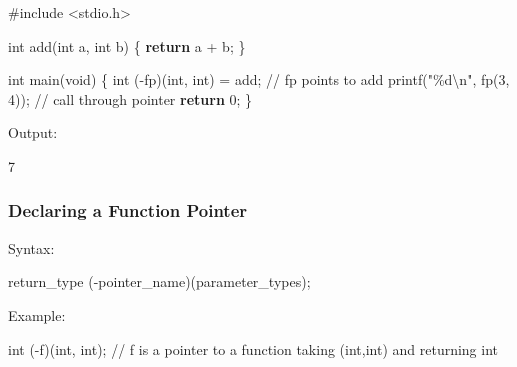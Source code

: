 \documentclass[
  letterpaper,
  DIV=11,
  numbers=noendperiod]{scrreprt}
\newenvironment{Shaded}{\begin{snugshade}}{\end{snugshade}}
\newcommand{\CommentTok}[1]{\textcolor[rgb]{0.37,0.37,0.37}{#1}}
\newcommand{\ControlFlowTok}[1]{\textcolor[rgb]{0.00,0.23,0.31}{\textbf{#1}}}
\newcommand{\DataTypeTok}[1]{\textcolor[rgb]{0.68,0.00,0.00}{#1}}
\newcommand{\DecValTok}[1]{\textcolor[rgb]{0.68,0.00,0.00}{#1}}
\newcommand{\ExtensionTok}[1]{\textcolor[rgb]{0.00,0.23,0.31}{#1}}
\newcommand{\ImportTok}[1]{\textcolor[rgb]{0.00,0.46,0.62}{#1}}
\newcommand{\NormalTok}[1]{\textcolor[rgb]{0.00,0.23,0.31}{#1}}
\newcommand{\OperatorTok}[1]{\textcolor[rgb]{0.37,0.37,0.37}{#1}}
\newcommand{\PreprocessorTok}[1]{\textcolor[rgb]{0.68,0.00,0.00}{#1}}
\newcommand{\SpecialCharTok}[1]{\textcolor[rgb]{0.37,0.37,0.37}{#1}}
\newcommand{\StringTok}[1]{\textcolor[rgb]{0.13,0.47,0.30}{#1}}
\begin{document}
\begin{Shaded}
\begin{Highlighting}[]
\PreprocessorTok{\#include }\ImportTok{\textless{}stdio.h\textgreater{}}

\DataTypeTok{int}\NormalTok{ add}\OperatorTok{(}\DataTypeTok{int}\NormalTok{ a}\OperatorTok{,} \DataTypeTok{int}\NormalTok{ b}\OperatorTok{)} \OperatorTok{\{} \ControlFlowTok{return}\NormalTok{ a }\OperatorTok{+}\NormalTok{ b}\OperatorTok{;} \OperatorTok{\}}

\DataTypeTok{int}\NormalTok{ main}\OperatorTok{(}\DataTypeTok{void}\OperatorTok{)} \OperatorTok{\{}
    \DataTypeTok{int} \OperatorTok{({-}}\NormalTok{fp}\OperatorTok{)(}\DataTypeTok{int}\OperatorTok{,} \DataTypeTok{int}\OperatorTok{)} \OperatorTok{=}\NormalTok{ add}\OperatorTok{;}   \CommentTok{// fp points to add}
\NormalTok{    printf}\OperatorTok{(}\StringTok{"}\SpecialCharTok{\%d\textbackslash{}n}\StringTok{"}\OperatorTok{,}\NormalTok{ fp}\OperatorTok{(}\DecValTok{3}\OperatorTok{,} \DecValTok{4}\OperatorTok{));}    \CommentTok{// call through pointer}
    \ControlFlowTok{return} \DecValTok{0}\OperatorTok{;}
\OperatorTok{\}}
\end{Highlighting}
\end{Shaded}

Output:

\begin{Shaded}
\begin{Highlighting}[]
\ExtensionTok{7}
\end{Highlighting}
\end{Shaded}

\subsubsection{Declaring a Function
Pointer}\label{declaring-a-function-pointer}

Syntax:

\begin{Shaded}
\begin{Highlighting}[]
\NormalTok{return\_type }\OperatorTok{({-}}\NormalTok{pointer\_name}\OperatorTok{)(}\NormalTok{parameter\_types}\OperatorTok{);}
\end{Highlighting}
\end{Shaded}

Example:

\begin{Shaded}
\begin{Highlighting}[]
\DataTypeTok{int} \OperatorTok{({-}}\NormalTok{f}\OperatorTok{)(}\DataTypeTok{int}\OperatorTok{,} \DataTypeTok{int}\OperatorTok{);}   \CommentTok{// f is a pointer to a function taking (int,int) and returning int}
\end{Highlighting}
\end{Shaded}
\end{document}
